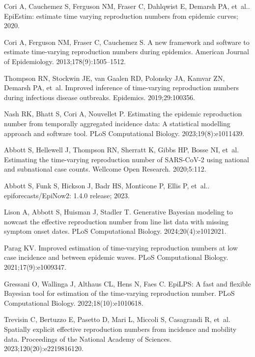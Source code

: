 \documentclass[10pt,letterpaper]{article}
\begin{document}
\begin{thebibliography}{10}
  Cori A, Cauchemez S, Ferguson NM, Fraser C, Dahlqwist E, Demarsh PA, et~al..
    {EpiEstim}: estimate time varying reproduction numbers from epidemic curves;
    2020.
  
  Cori A, Ferguson NM, Fraser C, Cauchemez S.
  \newblock A new framework and software to estimate time-varying reproduction
    numbers during epidemics.
  \newblock American Journal of Epidemiology. 2013;178(9):1505--1512.
  
  Thompson RN, Stockwin JE, van Gaalen RD, Polonsky JA, Kamvar ZN, Demarsh PA,
    et~al.
  \newblock Improved inference of time-varying reproduction numbers during
    infectious disease outbreaks.
  \newblock Epidemics. 2019;29:100356.
  
  Nash RK, Bhatt S, Cori A, Nouvellet P.
  \newblock Estimating the epidemic reproduction number from temporally
    aggregated incidence data: A statistical modelling approach and software
    tool.
  \newblock PLoS Computational Biology. 2023;19(8):e1011439.
  
  Abbott S, Hellewell J, Thompson RN, Sherratt K, Gibbs HP, Bosse NI, et~al.
  \newblock Estimating the time-varying reproduction number of {SARS-CoV-2} using
    national and subnational case counts.
  \newblock Wellcome Open Research. 2020;5:112.
  
  Abbott S, Funk S, Hickson J, Badr HS, Monticone P, Ellis P, et~al..
    epiforecasts/{EpiNow2}: 1.4.0 release; 2023.
  
  Lison A, Abbott S, Huisman J, Stadler T.
  \newblock Generative {B}ayesian modeling to nowcast the effective reproduction
    number from line list data with missing symptom onset dates.
  \newblock PLoS Computational Biology. 2024;20(4):e1012021.
  
  Parag KV.
  \newblock Improved estimation of time-varying reproduction numbers at low case
    incidence and between epidemic waves.
  \newblock PLoS Computational Biology. 2021;17(9):e1009347.
  
  Gressani O, Wallinga J, Althaus CL, Hens N, Faes C.
  \newblock EpiLPS: A fast and flexible {B}ayesian tool for estimation of the
    time-varying reproduction number.
  \newblock PLoS Computational Biology. 2022;18(10):e1010618.
  
  Trevisin C, Bertuzzo E, Pasetto D, Mari L, Miccoli S, Casagrandi R, et~al.
  \newblock Spatially explicit effective reproduction numbers from incidence and
    mobility data.
  \newblock Proceedings of the National Academy of Sciences.
    2023;120(20):e2219816120.
  

\end{thebibliography}
\end{document}
